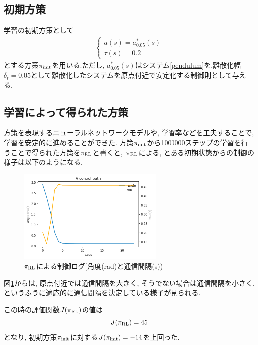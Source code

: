 \documentclass{jsarticle}
\begin{document}
\subsection{初期方策}
学習の初期方策として
\begin{align}
\begin{cases}
	a(s)=a_{0.05}^{*}(s)\\
	\tau(s)=0.2
\end{cases} \label{pi_init}
\end{align}
とする方策$\pi_{\rm{init}}$を用いる.ただし, $a_{0.05}^{*}(s)$はシステム\eqref{pendulum}を,離散化幅$\delta_t=0.05$として離散化したシステムを原点付近で安定化する制御則として与える.

\subsection{学習によって得られた方策}
方策を表現するニューラルネットワークモデルや, 学習率などを工夫することで, 学習を安定的に進めることができた. 方策$\pi_{\rm{init}}$から1000000ステップの学習を行うことで得られた方策を$\pi_{\rm{RL}}$と書くと,~$\pi_{\rm{RL}}$による, とある初期状態からの制御の様子は以下のようになる.
\begin{figure}[h]
	\centering
 	\includegraphics[width=7cm]{self_trigger_log.png}
 	\caption{$\pi_{\rm{RL}}$による制御ログ(角度(rad)と通信間隔(s))} \label{self_trigger_log}
\end{figure}\par
図\ref{self_trigger_log}からは, 原点付近では通信間隔を大きく, そうでない場合は通信間隔を小さく, というふうに適応的に通信間隔を決定している様子が見られる.
\par
この時の評価関数$J(\pi_{\rm{RL}})$の値は
\begin{equation}
	J(\pi_{\rm{RL}}) = 45
\end{equation}
となり, 初期方策$\pi_{\rm{init}}$に対する$J(\pi_{\rm{init}})=-14$を上回った.\par
\end{document}
